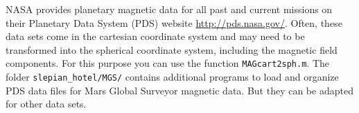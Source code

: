\documentclass[11pt]{article}
\begin{document}
NASA provides planetary magnetic data for all past and current missions on their Planetary Data System (PDS) website \url{http://pds.nasa.gov/}. Often, these data sets come in the cartesian coordinate system and may need to be transformed into the spherical coordinate system, including the magnetic field components. For this purpose you can use the function \texttt{MAGcart2sph.m}. The folder \verb+slepian_hotel/MGS/+ contains additional programs to load and organize PDS data files for Mars Global Surveyor magnetic data. But they can be adapted for other data sets.


 


\end{document}

